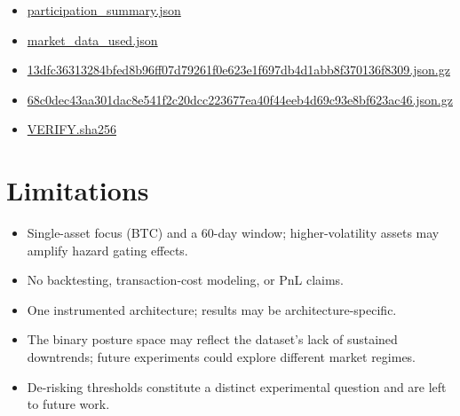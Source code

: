 \documentclass[12pt,a4paper]{article}
\begin{document}
\begin{itemize}
  \item \href{https://github.com/jhcragin/SpiralBrain-v3.0-public/blob/main/Emotion-Conditioned%20Risk%20Posture%20in%20Crypto%20Markets/results/participation_summary.json}{participation_summary.json}
  \item \href{https://github.com/jhcragin/SpiralBrain-v3.0-public/blob/main/Emotion-Conditioned%20Risk%20Posture%20in%20Crypto%20Markets/results/provenance/market_data_used.json}{market_data_used.json}
  \item \href{https://github.com/jhcragin/SpiralBrain-v3.0-public/blob/main/Emotion-Conditioned%20Risk%20Posture%20in%20Crypto%20Markets/results/provenance/raw/13dfc36313284bfed8b96ff07d79261f0e623e1f697db4d1abb8f370136f8309.json.gz}{13dfc36313284bfed8b96ff07d79261f0e623e1f697db4d1abb8f370136f8309.json.gz}
  \item \href{https://github.com/jhcragin/SpiralBrain-v3.0-public/blob/main/Emotion-Conditioned%20Risk%20Posture%20in%20Crypto%20Markets/results/provenance/raw/68c0dec43aa301dac8e541f2c20dcc223677ea40f44eeb4d69c93e8bf623ac46.json.gz}{68c0dec43aa301dac8e541f2c20dcc223677ea40f44eeb4d69c93e8bf623ac46.json.gz}
  \item \href{https://github.com/jhcragin/SpiralBrain-v3.0-public/blob/main/Emotion-Conditioned%20Risk%20Posture%20in%20Crypto%20Markets/results/VERIFY.sha256}{VERIFY.sha256}
\end{itemize}

\section{Limitations}

\begin{itemize}
	\item Single-asset focus (BTC) and a 60-day window; higher-volatility assets may amplify hazard gating effects.
	\item No backtesting, transaction-cost modeling, or PnL claims.
	\item One instrumented architecture; results may be architecture-specific.
	\item The binary posture space may reflect the dataset's lack of sustained downtrends; future experiments could explore different market regimes.
	\item De-risking thresholds constitute a distinct experimental question and are left to future work.
\end{itemize}
\end{document}
